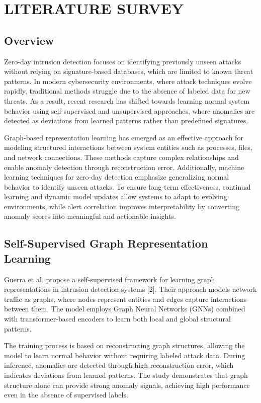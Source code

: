 \chapter{LITERATURE SURVEY}
\label{ch:literature-survey}

\section{Overview}
Zero-day intrusion detection focuses on identifying previously unseen attacks
without relying on signature-based databases, which are limited to known threat
patterns. In modern cybersecurity environments, where attack techniques evolve
rapidly, traditional methods struggle due to the absence of labeled data for new
threats. As a result, recent research has shifted towards learning normal system
behavior using self-supervised and unsupervised approaches, where anomalies are
detected as deviations from learned patterns rather than predefined signatures.

Graph-based representation learning has emerged as an effective approach for
modeling structured interactions between system entities such as processes,
files, and network connections. These methods capture complex relationships and
enable anomaly detection through reconstruction error. Additionally, machine
learning techniques for zero-day detection emphasize generalizing normal behavior
to identify unseen attacks. To ensure long-term effectiveness, continual learning
and dynamic model updates allow systems to adapt to evolving environments, while
alert correlation improves interpretability by converting anomaly scores into
meaningful and actionable insights.

\section{Self-Supervised Graph Representation Learning}
Guerra et al. propose a self-supervised framework for learning graph
representations in intrusion detection systems [2]. Their approach models network
traffic as graphs, where nodes represent entities and edges capture interactions
between them. The model employs Graph Neural Networks (GNNs) combined with
transformer-based encoders to learn both local and global structural patterns.

The training process is based on reconstructing graph structures, allowing the
model to learn normal behavior without requiring labeled attack data. During
inference, anomalies are detected through high reconstruction error, which
indicates deviations from learned patterns. The study demonstrates that graph
structure alone can provide strong anomaly signals, achieving high performance
even in the absence of supervised labels.

